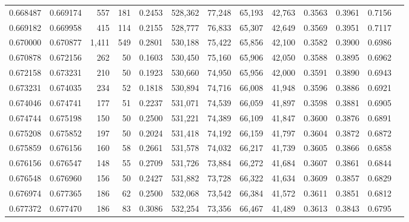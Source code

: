 \begin{tabular}{rrrrrrrrrrrrr}
0.668487 & 0.669174 &   557 & 181 &                                     0.2453 & 528,362 &  77,248 &  65,193 &  42,763 & 0.3563 & 0.3961 & 0.7156 \\
0.669182 & 0.669958 &   415 & 114 &                                     0.2155 & 528,777 &  76,833 &  65,307 &  42,649 & 0.3569 & 0.3951 & 0.7117 \\
0.670000 & 0.670877 & 1,411 & 549 &                                     0.2801 & 530,188 &  75,422 &  65,856 &  42,100 & 0.3582 & 0.3900 & 0.6986 \\
0.670878 & 0.672156 &   262 &  50 &                                     0.1603 & 530,450 &  75,160 &  65,906 &  42,050 & 0.3588 & 0.3895 & 0.6962 \\
0.672158 & 0.673231 &   210 &  50 &                                     0.1923 & 530,660 &  74,950 &  65,956 &  42,000 & 0.3591 & 0.3890 & 0.6943 \\
0.673231 & 0.674035 &   234 &  52 &                                     0.1818 & 530,894 &  74,716 &  66,008 &  41,948 & 0.3596 & 0.3886 & 0.6921 \\
0.674046 & 0.674741 &   177 &  51 &                                     0.2237 & 531,071 &  74,539 &  66,059 &  41,897 & 0.3598 & 0.3881 & 0.6905 \\
0.674744 & 0.675198 &   150 &  50 &                                     0.2500 & 531,221 &  74,389 &  66,109 &  41,847 & 0.3600 & 0.3876 & 0.6891 \\
0.675208 & 0.675852 &   197 &  50 &                                     0.2024 & 531,418 &  74,192 &  66,159 &  41,797 & 0.3604 & 0.3872 & 0.6872 \\
0.675859 & 0.676156 &   160 &  58 &                                     0.2661 & 531,578 &  74,032 &  66,217 &  41,739 & 0.3605 & 0.3866 & 0.6858 \\
0.676156 & 0.676547 &   148 &  55 &                                     0.2709 & 531,726 &  73,884 &  66,272 &  41,684 & 0.3607 & 0.3861 & 0.6844 \\
0.676548 & 0.676960 &   156 &  50 &                                     0.2427 & 531,882 &  73,728 &  66,322 &  41,634 & 0.3609 & 0.3857 & 0.6829 \\
0.676974 & 0.677365 &   186 &  62 &                                     0.2500 & 532,068 &  73,542 &  66,384 &  41,572 & 0.3611 & 0.3851 & 0.6812 \\
0.677372 & 0.677470 &   186 &  83 &                                     0.3086 & 532,254 &  73,356 &  66,467 &  41,489 & 0.3613 & 0.3843 & 0.6795 \\

\end{tabular}
